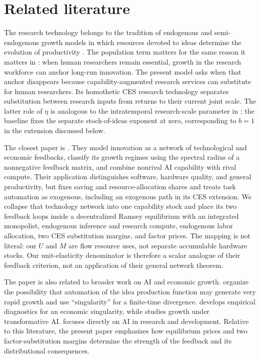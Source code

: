 \section{Related literature}

The research technology belongs to the tradition of endogenous and
semi-endogenous growth models in which resources devoted to ideas determine the
evolution of productivity \citep{romer1990,aghionhowitt1992,jones1995}. The
population term matters for the same reason it matters in \citet{jones1995}: when
human researchers remain essential, growth in the research workforce can anchor
long-run innovation. The present model asks when that anchor disappears because
capability-augmented research services can substitute for human researchers. Its
homothetic CES research technology separates substitution between research inputs
from returns to their current joint scale. The latter role of \(\eta\) is analogous
to the intratemporal research-scale parameter in \citet{jones1995}; the baseline
fixes the separate stock-of-ideas exponent at zero, corresponding to \(b=1\) in
the extension discussed below.

The closest paper is \citet{davidsonetal2026}. They model innovation as a network
of technological and economic feedbacks, classify its growth regimes using the
spectral radius of a nonnegative feedback matrix, and combine nonrival AI
capability with rival compute. Their application distinguishes software, hardware
quality, and general productivity, but fixes saving and resource-allocation shares
and treats task automation as exogenous, including an exogenous path in its CES
extension. We collapse that technology network into one
capability stock and place its two feedback loops inside a decentralized Ramsey
equilibrium with an integrated monopolist, endogenous inference and research
compute, endogenous labor allocation, two CES substitution margins, and factor
prices. The mapping is not literal: our \(U\) and \(M\) are flow resource uses,
not separate accumulable hardware stocks. Our unit-elasticity denominator is therefore a scalar analogue of their
feedback criterion, not an application of their general network theorem.

The paper is also related to broader work on AI and economic growth.
\citet{aghionjonesjones2019} organize the possibility that automation of the idea
production function may generate very rapid growth and use ``singularity'' for a
finite-time divergence. \citet{nordhaus2021} develops empirical diagnostics for
an economic singularity, while \citet{trammellkorinek2023} studies growth under
transformative AI. \citet{jones2025rd} focuses directly on AI in research and
development. Relative to this literature, the present paper emphasizes how
equilibrium prices and two factor-substitution margins determine the strength of
the feedback and its distributional consequences.


